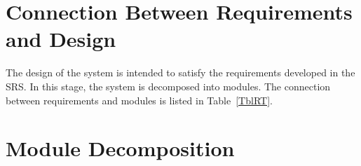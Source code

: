 \documentclass[12pt, titlepage]{article}
\begin{document}
\section{Connection Between Requirements and Design} \label{SecConnection}

The design of the system is intended to satisfy the requirements developed in
the SRS. In this stage, the system is decomposed into modules. The connection
between requirements and modules is listed in Table~\ref{TblRT}.


  
  
  
  
  


\section{Module Decomposition} \label{SecMD}
\end{document}
